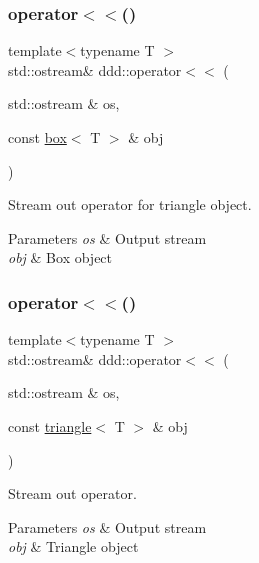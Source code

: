 \subsubsection{\texorpdfstring{operator$<$$<$()}{operator<<()}\hspace{0.1cm}{\footnotesize\ttfamily [5/10]}}
{\footnotesize\ttfamily template$<$typename T $>$ \\
std\+::ostream\& ddd\+::operator$<$$<$ (\begin{DoxyParamCaption}\item[{std\+::ostream \&}]{os,  }\item[{const \hyperlink{classddd_1_1box}{box}$<$ T $>$ \&}]{obj }\end{DoxyParamCaption})\hspace{0.3cm}{\ttfamily [inline]}}



Stream out operator for triangle object. 


\begin{DoxyParams}{Parameters}
{\em os} & Output stream \\
\hline
{\em obj} & Box object \\
\hline
\end{DoxyParams}
\mbox{\label{namespaceddd_a3a6f828f85e4fa306f0d950f1aab4f64}} 
\subsubsection{\texorpdfstring{operator$<$$<$()}{operator<<()}\hspace{0.1cm}{\footnotesize\ttfamily [6/10]}}
{\footnotesize\ttfamily template$<$typename T $>$ \\
std\+::ostream\& ddd\+::operator$<$$<$ (\begin{DoxyParamCaption}\item[{std\+::ostream \&}]{os,  }\item[{const \hyperlink{classddd_1_1triangle}{triangle}$<$ T $>$ \&}]{obj }\end{DoxyParamCaption})\hspace{0.3cm}{\ttfamily [inline]}}



Stream out operator. 


\begin{DoxyParams}{Parameters}
{\em os} & Output stream \\
\hline
{\em obj} & Triangle object \\
\hline
\end{DoxyParams}
\mbox{\label{namespaceddd_a58ae88cefdf3b919e400db6de59f4cfc}} 
